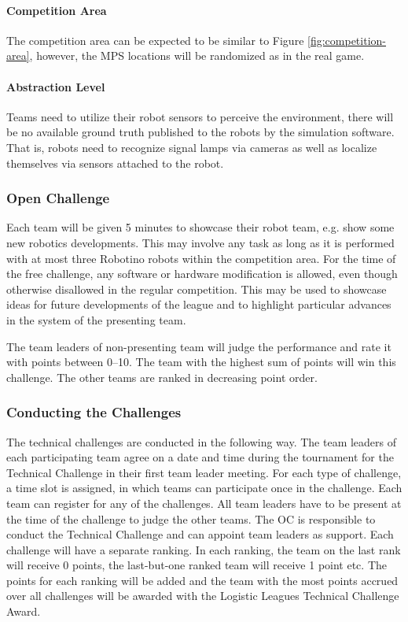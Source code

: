 \documentclass[12pt,twoside]{article}
\begin{document}
\vspace{-2ex}\paragraph{Competition Area} The competition area can be
expected to be similar to Figure \ref{fig:competition-area}, however,
the MPS locations will be randomized as in the real game.

\vspace{-2ex}\paragraph{Abstraction Level} Teams need to utilize their
robot sensors to perceive the environment, there will be no available
ground truth published to the robots by the simulation software. That
is, robots need to recognize signal lamps via cameras as well as
localize themselves via sensors attached to the robot.


\subsubsection{Open Challenge~}
Each team will be given 5 minutes to showcase their robot team, e.g.
show some new robotics developments. This may involve any task as long
as it is performed with at most three Robotino robots within the
competition area. For the time of the free challenge, any software or
hardware modification is allowed, even though otherwise disallowed in
the regular competition. This may be used to showcase ideas for future
developments of the league and to highlight particular advances in the
system of the presenting team.

The team leaders of non-presenting team will judge the performance and
rate it with points between 0--10.  The team with the highest sum of
points will win this challenge. The other teams are ranked in
decreasing point order.

\subsubsection{Conducting the Challenges~}
The technical challenges are conducted in the following way. The team
leaders of each participating team agree on a date and time during the
tournament for the Technical Challenge in their first team leader
meeting. For each type of challenge, a time slot is assigned, in which
teams can participate once in the challenge. Each team can register
for any of the challenges. All team leaders have to be present at the
time of the challenge to judge the other teams. The OC is responsible
to conduct the Technical Challenge and can appoint team leaders as
support. Each challenge will have a separate ranking. In each ranking,
the team on the last rank will receive 0 points, the last-but-one
ranked team will receive 1 point etc. The points for each ranking will
be added and the team with the most points accrued over all challenges
will be awarded with the Logistic Leagues Technical Challenge Award.
\end{document}
